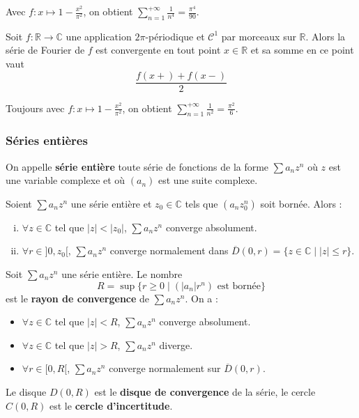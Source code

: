 	\begin{example}
		Avec $f : x \mapsto 1 - \frac{x^2}{\pi^2}$, on obtient $\sum_{n=1}^{+\infty} \frac{1}{n^4} = \frac{\pi^4}{90}$.
	\end{example}
	
	\begin{theorem}
		Soit $f : \mathbb{R} \rightarrow \mathbb{C}$ une application $2\pi$-périodique et $\mathcal{C}^1$ par morceaux sur $\mathbb{R}$. Alors la série de Fourier de $f$ est convergente en tout point $x \in \mathbb{R}$ et sa somme en ce point vaut
		\[ \frac{f(x+) + f(x-)}{2} \]
	\end{theorem}
	
	\begin{example}
		Toujours avec $f : x \mapsto 1 - \frac{x^2}{\pi^2}$, on obtient $\sum_{n=1}^{+\infty} \frac{1}{n^2} = \frac{\pi^2}{6}$.
	\end{example}
	
	\subsubsection{Séries entières}
	
	
	\begin{definition}
		On appelle \textbf{série entière} toute série de fonctions de la forme $\sum a_n z^n$ où $z$ est une variable complexe et où $(a_n)$ est une suite complexe.
	\end{definition}
	
	\begin{lemma}[Abel]
		Soient $\sum a_n z^n$ une série entière et $z_0 \in \mathbb{C}$ tels que $(a_n z_0^n)$ soit bornée. Alors :
		\begin{enumerate}[(i)]
			\item $\forall z \in \mathbb{C}$ tel que $|z| < |z_0|$, $\sum a_n z^n$ converge absolument.
			\item $\forall r \in ]0,z_0[, \, \sum a_n z^n$ converge normalement dans $\overline{D}(0, r) = \{ z \in \mathbb{C} \mid |z| \leq r \}$.
		\end{enumerate}
	\end{lemma}
	
	\begin{definition}
		Soit $\sum a_n z^n$ une série entière. Le nombre
		\[ R = \sup \{ r \geq 0 \mid (|a_n|r^n) \text{ est bornée} \} \]
		est le \textbf{rayon de convergence} de $\sum a_n z^n$. On a :
		\begin{itemize}
			\item $\forall z \in \mathbb{C}$ tel que $|z| < R$, $\sum a_n z^n$ converge absolument.
			\item $\forall z \in \mathbb{C}$ tel que $|z| > R$, $\sum a_n z^n$ diverge.
			\item $\forall r \in [0,R[$, $\sum a_n z^n$ converge normalement sur $\overline{D}(0,r)$.
		\end{itemize}
		Le disque $D(0,R)$ est le \textbf{disque de convergence} de la série, le cercle $C(0,R)$ est le \textbf{cercle d'incertitude}.
	\end{definition}
	
